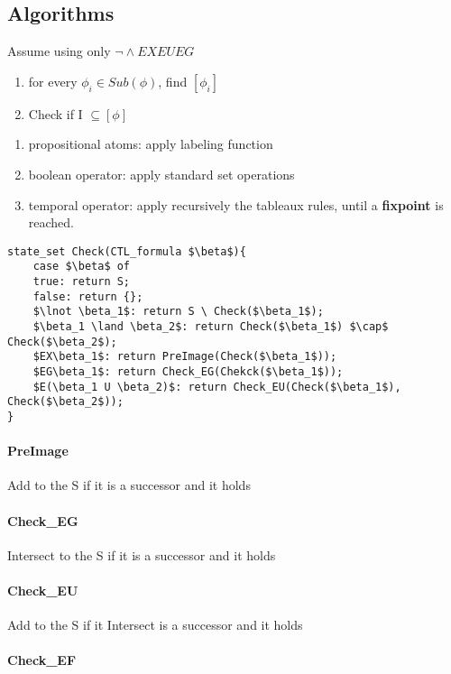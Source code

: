 \documentclass[11pt]{article}
\begin{document}
\subsection{Algorithms} %
\label{sub:algorithms}
Assume using only $ \lnot \land EX EU EG$
\begin{enumerate}
	\item for every $\phi _i \in Sub(\phi)$, find $[\phi _i]$
	\item Check if I $\subseteq [\phi]$
\end{enumerate}
\begin{enumerate}
	\item propositional atoms: apply labeling function
	\item boolean operator: apply standard set operations
	\item temporal operator: apply recursively the tableaux rules, until a \textbf{fixpoint} is reached.
\end{enumerate}

\begin{lstlisting}[mathescape=true]
state_set Check(CTL_formula $\beta$){
	case $\beta$ of
	true: return S;
	false: return {};
	$\lnot \beta_1$: return S \ Check($\beta_1$);
	$\beta_1 \land \beta_2$: return Check($\beta_1$) $\cap$ Check($\beta_2$);
	$EX\beta_1$: return PreImage(Check($\beta_1$));
	$EG\beta_1$: return Check_EG(Chekck($\beta_1$));
	$E(\beta_1 U \beta_2)$: return Check_EU(Check($\beta_1$), Check($\beta_2$));
}
\end{lstlisting}

\paragraph{PreImage} %
\label{par:preimage}
Add to the S if it is a successor and it holds 
\paragraph{Check\_EG} %
\label{par:check_eg}
Intersect to the S if it is a successor and it holds 
\paragraph{Check\_EU} %
\label{par:check_eu}
Add to the S if it Intersect is a successor and it holds
\paragraph{Check\_EF} %
\label{par:check_ef}
\end{document}
